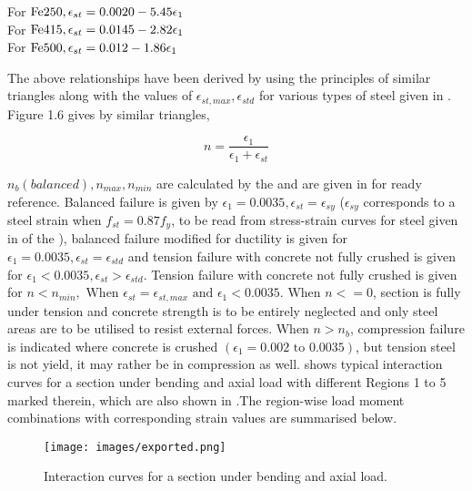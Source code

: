 \begin{center}
For $\fetwofivezero,\epsilon_{st}=0.0020-5.45\epsilon_1$\\
For $\fefouronefive,\epsilon_{st}=0.0145-2.82\epsilon_1$\\
For $\fefivezerozero,\epsilon_{st}=0.012-1.86\epsilon_1$
\end{center}

The above relationships have been derived by using the principles of
similar triangles along with the values of $\epsilon_{st,max}, \epsilon_{std}$ for
various types of steel given in . Figure 1.6 gives by
similar triangles,

\begin{equation}
n=\frac{\epsilon_1}{\epsilon_1+\epsilon_{st}}
\end{equation}

$n_b (balanced), n_{max}, n_{min}$ are calculated by the  and are
given in  for ready reference. Balanced failure is given by
$\epsilon_1 = 0.0035, \epsilon_{st} =\epsilon_{sy}$ ($\epsilon_{sy}$
corresponds to a steel strain when $f_{st} = 0.87 f_y$, to be read from
stress-strain curves for steel given in  of the
), balanced failure modified for ductility is given for
$\epsilon_1 = 0.0035, \epsilon_{st} = \epsilon_{std}$ and tension failure
with concrete not fully crushed is given for
$\epsilon_1 < 0.0035, \epsilon_{st} > \epsilon_{std}$. Tension failure 
with concrete not fully crushed is given for $n < n_{min},\text{ When }
\epsilon_{st} = \epsilon_{st,max} \text{ and } \epsilon_1 < 0.0035.
\text{ When } n<= 0$, section is fully under tension and concrete
strength is to be entirely neglected and only steel areas are to be
utilised to resist external forces. When $n>n_b$, compression failure
is indicated where concrete is crushed $(\epsilon_1= 0.002 \text{ to } 0.0035)$,
but tension steel is not yield, it may rather be in compression as well.
 shows typical interaction curves for a section under bending
and axial load with different Regions 1 to 5 marked therein, which are
also shown in .The region-wise load moment combinations with
corresponding strain values are summarised below.

\begin{figure}
\centering
\texttt{[image: images/exported.png]}
\caption{Interaction curves for a section under bending and axial load.}
\label{fig:exported}
\end{figure}

